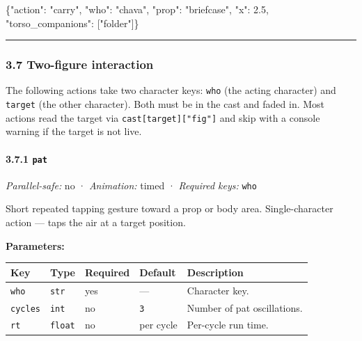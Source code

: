\documentclass[
  11pt,
]{book}
\newenvironment{Shaded}{}{}
\newcommand{\DataTypeTok}[1]{\textcolor[rgb]{0.56,0.13,0.00}{#1}}
\newcommand{\FloatTok}[1]{\textcolor[rgb]{0.25,0.63,0.44}{#1}}
\newcommand{\FunctionTok}[1]{\textcolor[rgb]{0.02,0.16,0.49}{#1}}
\newcommand{\OtherTok}[1]{\textcolor[rgb]{0.00,0.44,0.13}{#1}}
\newcommand{\StringTok}[1]{\textcolor[rgb]{0.25,0.44,0.63}{#1}}
\begin{document}
\begin{Shaded}
\begin{Highlighting}[]
\FunctionTok{\{}\DataTypeTok{"action"}\FunctionTok{:} \StringTok{"carry"}\FunctionTok{,} \DataTypeTok{"who"}\FunctionTok{:} \StringTok{"chava"}\FunctionTok{,} \DataTypeTok{"prop"}\FunctionTok{:} \StringTok{"briefcase"}\FunctionTok{,} \DataTypeTok{"x"}\FunctionTok{:} \FloatTok{2.5}\FunctionTok{,}
 \DataTypeTok{"torso\_companions"}\FunctionTok{:} \OtherTok{[}\StringTok{"folder"}\OtherTok{]}\FunctionTok{\}}
\end{Highlighting}
\end{Shaded}

\begin{center}\rule{0.5\linewidth}{0.5pt}\end{center}

\subsubsection{3.7 Two-figure interaction}\label{two-figure-interaction}

The following actions take two character keys: \texttt{who} (the acting
character) and \texttt{target} (the other character). Both must be in
the cast and faded in. Most actions read the target via
\texttt{cast{[}target{]}{[}"fig"{]}} and skip with a console warning if
the target is not live.

\paragraph{\texorpdfstring{3.7.1 \texttt{pat}}{3.7.1 pat}}\label{pat}

\emph{Parallel-safe:} no · \emph{Animation:} timed · \emph{Required
keys:} \texttt{who}

Short repeated tapping gesture toward a prop or body area.
Single-character action --- taps the air at a target position.

\textbf{Parameters:}

\begin{longtable}[]{@{}lllll@{}}
\toprule\noalign{}
Key & Type & Required & Default & Description \\
\midrule\noalign{}
\endhead
\bottomrule\noalign{}
\endlastfoot
\texttt{who} & \texttt{str} & yes & --- & Character key. \\
\texttt{cycles} & \texttt{int} & no & \texttt{3} & Number of pat
oscillations. \\
\texttt{rt} & \texttt{float} & no & per cycle & Per-cycle run time. \\
\end{longtable}
\end{document}
